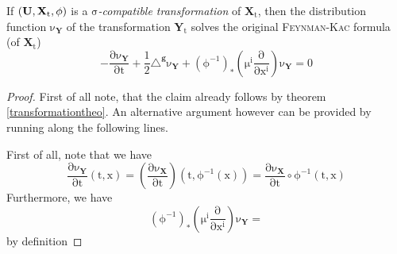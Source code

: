 \documentclass[10 pt,english]{smfart}
\newcommand{\Xt}{\mathrm{\mathbf{X}}_{t}}
\newcommand{\X}{\mathrm{\mathbf{X}}}
\newcommand{\Yt}{\mathrm{\mathbf{Y}}_{t}}
\newcommand{\Y}{\mathrm{\mathbf{Y}}}
\newcommand{\g}{\mathrm{\mathbf{g}}}
\newcommand{\U}{{\bf{U}}}
\begin{document}
\begin{theo}\label{transformationtheodens} If $\mathrm{(\U,\Xt,\phi)}$ is a $\mathrm{\sigma}$\textit{-compatible transformation} of $\mathrm{\Xt}$, then the distribution function $\mathrm{\nu_{\Y}}$ of the transformation $\mathrm{\Yt}$ solves the original {\scshape{Feynman-Kac}} formula (of $\mathrm{\Xt}$)
\begin{equation}
\mathrm{-\frac{\partial \nu_{\Y}}{\partial t}+\frac{1}{2}\triangle^{\g}\nu_{\Y}+\left(\phi^{-1}\right)_{*}\left(\mu^{i}\frac{\partial }{\partial x^{i}}\right)\nu_{\Y}=0}
\end{equation}
\end{theo}
\begin{proof} First of all note, that the claim already follows by theorem \ref{transformationtheo}. An alternative argument however can be provided by running along the following lines.

First of all, note that we have 
\begin{equation}
\mathrm{\frac{\partial \nu_{\Y}}{\partial t}(t,x)=\left(\frac{\partial \nu_{\X}}{\partial t}\right)\left(t, \phi^{-1}(x)\right)=\frac{\partial \nu_{\X}}{\partial t}\circ \phi^{-1}\left(t,x\right)}
\end{equation} 
Furthermore, we have
\begin{equation}
\mathrm{\left(\phi^{-1}\right)_{*}\left(\mu^{i}\frac{\partial }{\partial x^{i}}\right)\nu_{\Y}=}
\end{equation} by definition




\end{proof}
\end{document}
